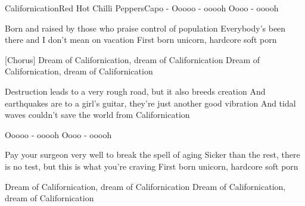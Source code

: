\begin{song}{Californication}{Red Hot Chilli Peppers}{Capo -}
  Ooooo - ooooh   Oooo -  ooooh

Born and raised by those who praise control of population
Everybody's been there and I don't mean on vacation
   First born unicorn,     hardcore soft porn

[Chorus]
Dream of Californication,   dream of Californication
Dream of Californication,   dream of Californication


Destruction leads to a very rough road, but it also breeds creation
And earthquakes are to a girl's guitar, they're just another good vibration
And tidal waves couldn't save the world from Californication

  Ooooo - ooooh   Oooo -  ooooh

Pay your surgeon very well to break the spell of aging
Sicker than the rest, there is no test, but this is what you're craving
   First born unicorn,     hardcore soft porn

Dream of Californication,   dream of Californication
Dream of Californication,   dream of Californication

\end{song}
   